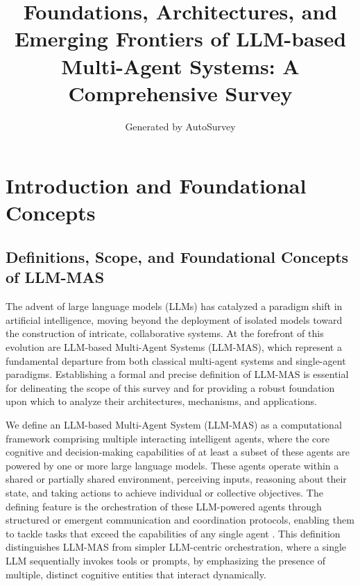 \documentclass[11pt]{article}
\title{Foundations, Architectures, and Emerging Frontiers of LLM-based Multi-Agent Systems: A Comprehensive Survey}
\author{Generated by AutoSurvey}
\date{}
\begin{document}
\maketitle
\tableofcontents
\newpage

\section{Introduction and Foundational Concepts}

\subsection{Definitions, Scope, and Foundational Concepts of LLM-MAS}

The advent of large language models (LLMs) has catalyzed a paradigm shift in artificial intelligence, moving beyond the deployment of isolated models toward the construction of intricate, collaborative systems. At the forefront of this evolution are LLM-based Multi-Agent Systems (LLM-MAS), which represent a fundamental departure from both classical multi-agent systems and single-agent paradigms. Establishing a formal and precise definition of LLM-MAS is essential for delineating the scope of this survey and for providing a robust foundation upon which to analyze their architectures, mechanisms, and applications.

We define an LLM-based Multi-Agent System (LLM-MAS) as a computational framework comprising multiple interacting intelligent agents, where the core cognitive and decision-making capabilities of at least a subset of these agents are powered by one or more large language models. These agents operate within a shared or partially shared environment, perceiving inputs, reasoning about their state, and taking actions to achieve individual or collective objectives. The defining feature is the orchestration of these LLM-powered agents through structured or emergent communication and coordination protocols, enabling them to tackle tasks that exceed the capabilities of any single agent \cite{ref1,ref2}. This definition distinguishes LLM-MAS from simpler LLM-centric orchestration, where a single LLM sequentially invokes tools or prompts, by emphasizing the presence of multiple, distinct cognitive entities that interact dynamically.
\end{document}
